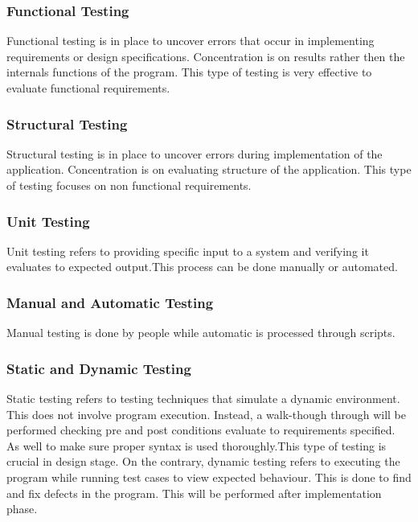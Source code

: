 \documentclass[12pt]{article}
\begin{document}
\subsubsection{Functional Testing}
Functional testing is in place to uncover errors that occur in implementing requirements or design specifications. Concentration is on results rather then the internals functions of the program. This type of testing is very effective to evaluate functional requirements.

\subsubsection{Structural Testing}
Structural testing is in place to uncover errors during implementation of the application. Concentration is on evaluating structure of the application. This type of testing focuses on non functional requirements.  

\subsubsection{Unit Testing}
Unit testing refers to providing specific input to a system and verifying it evaluates to expected output.This process can be done manually or automated.

\subsubsection{Manual and Automatic Testing}
Manual testing is done by people while automatic is processed through scripts. 

\subsubsection{Static and Dynamic Testing}
Static testing refers to testing techniques that simulate a dynamic environment. This does not involve program execution. Instead, a walk-though through will be performed checking pre and post conditions evaluate to requirements specified. As well to make sure proper syntax is used thoroughly.This type of testing is crucial in design stage. On the contrary, dynamic testing refers to executing the program while running test cases to view expected behaviour. This is done to find and fix defects in the program. This will be performed after implementation phase. 

%
%
\end{document}
